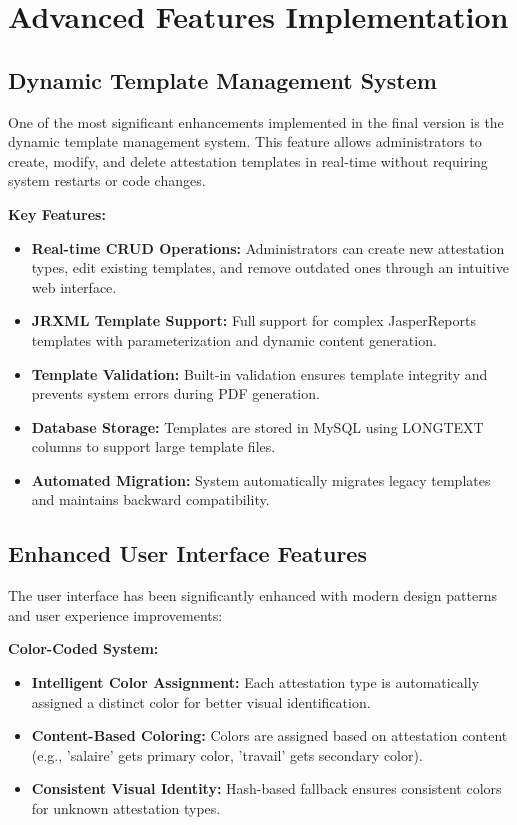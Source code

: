 \documentclass[a4paper,12pt]{report}
\begin{document}
\section{Advanced Features Implementation}
\begin{doublespace}

\subsection{Dynamic Template Management System}
\hspace{1cm}One of the most significant enhancements implemented in the final version is the dynamic template management system. This feature allows administrators to create, modify, and delete attestation templates in real-time without requiring system restarts or code changes.

\textbf{Key Features:}
\begin{itemize}
    \item \textbf{Real-time CRUD Operations:} Administrators can create new attestation types, edit existing templates, and remove outdated ones through an intuitive web interface.
    \item \textbf{JRXML Template Support:} Full support for complex JasperReports templates with parameterization and dynamic content generation.
    \item \textbf{Template Validation:} Built-in validation ensures template integrity and prevents system errors during PDF generation.
    \item \textbf{Database Storage:} Templates are stored in MySQL using LONGTEXT columns to support large template files.
    \item \textbf{Automated Migration:} System automatically migrates legacy templates and maintains backward compatibility.
\end{itemize}

\subsection{Enhanced User Interface Features}
\hspace{1cm}The user interface has been significantly enhanced with modern design patterns and user experience improvements:

\textbf{Color-Coded System:}
\begin{itemize}
    \item \textbf{Intelligent Color Assignment:} Each attestation type is automatically assigned a distinct color for better visual identification.
    \item \textbf{Content-Based Coloring:} Colors are assigned based on attestation content (e.g., 'salaire' gets primary color, 'travail' gets secondary color).
    \item \textbf{Consistent Visual Identity:} Hash-based fallback ensures consistent colors for unknown attestation types.
\end{itemize}


\end{doublespace}
\end{document}

